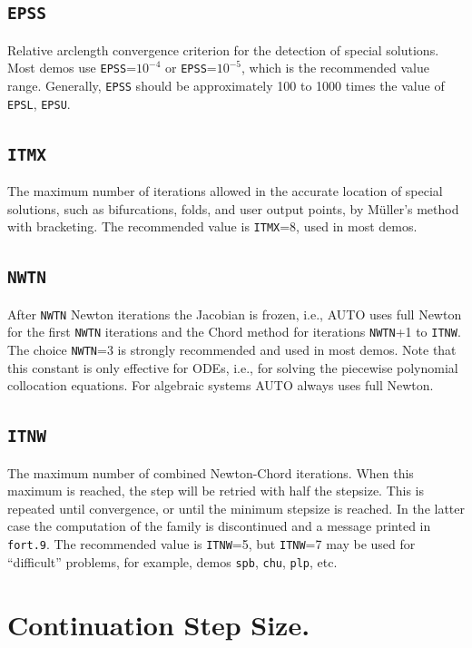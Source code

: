\documentclass[12pt]{report}
\begin{document}
\subsection{\tt EPSS}  \label{sec:EPSS}
 Relative arclength convergence criterion for the detection of special solutions. 
 Most demos use {\tt EPSS}=$10^{-4}$ or  {\tt EPSS}=$10^{-5}$,
 which is the recommended value range.
 Generally, {\tt EPSS} should be approximately 100 to 1000 times the value
 of {\tt EPSL}, {\tt EPSU}.
 
\subsection{\tt ITMX}  \label{sec:ITMX}
 The maximum number of iterations allowed in the accurate
 location of special solutions, such as bifurcations, folds, 
 and user output points, by M\"uller's method with bracketing.
 The recommended value is {\tt ITMX}=8, used in most demos.

\subsection{\tt NWTN}  \label{sec:NWTN}
 After {\tt NWTN} Newton iterations the Jacobian is frozen, i.e.,
 {\cal AUTO} uses full Newton for the first {\tt NWTN} iterations
 and the Chord method for iterations {\tt NWTN}+1 to {\tt ITNW}.
 The choice {\tt NWTN}=3 is strongly recommended and used in most demos.
 Note that this constant is only effective for ODEs, i.e., for solving
 the piecewise polynomial collocation equations.
 For algebraic systems {\cal AUTO} always uses full Newton.

\subsection{\tt ITNW}  \label{sec:ITNW}
 The maximum number of combined Newton-Chord iterations.
 When this maximum is reached, the step will be retried with 
 half the stepsize.
 This is repeated until convergence, or until the minimum
 stepsize is reached. In the latter case the computation of
 the family is discontinued and a message printed in {\tt fort.9}.
 The recommended value is {\tt ITNW}=5, but {\tt ITNW}=7 may be used for 
 ``difficult'' problems, for example, 
 demos {\tt spb}, {\tt chu}, {\tt plp}, etc.

\section{ Continuation Step Size.} \label{sec:step_size}
\end{document}
